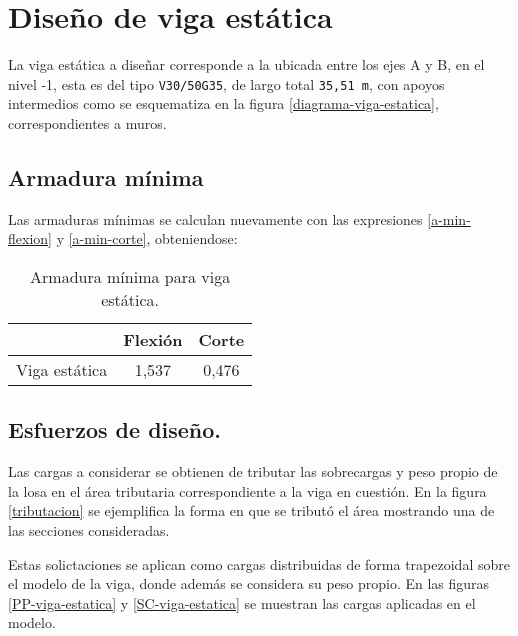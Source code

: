 \newpage
\section{Diseño de viga estática}

    La viga estática a diseñar corresponde a la ubicada entre los ejes A y B, en el nivel -1, esta es del tipo \texttt{V30/50G35}, de largo total \texttt{35,51 m}, con apoyos intermedios como se esquematiza en la figura \ref{diagrama-viga-estatica}, correspondientes a muros.
    
    
    \subsection{Armadura mínima}
        Las armaduras mínimas se calculan nuevamente con las expresiones \eqref{a-min-flexion} y \eqref{a-min-corte}, obteniendose:
        
        \begin{table}[H]
          \centering
          \caption{Armadura mínima para viga estática.}
            \begin{tabular}{ccc}
            \cline{2-3}          & Flexión & Corte \bigstrut\\
            \hline
            Viga estática & 1,537 & 0,476 \bigstrut\\
            \hline
            \end{tabular}%
          \label{area-minima-estatica}%
        \end{table}%
        
    \subsection{Esfuerzos de diseño.}
        
        Las cargas a considerar se obtienen de tributar las sobrecargas y peso propio de la losa en el área tributaria correspondiente a la viga en cuestión. En la figura \ref{tributacion} se ejemplifica la forma en que se tributó el área mostrando una de las secciones consideradas.
        
        
        Estas solictaciones se aplican como cargas distribuidas de forma trapezoidal sobre el modelo de la viga, donde además se considera su peso propio. En las figuras \ref{PP-viga-estatica} y \ref{SC-viga-estatica} se muestran las cargas aplicadas en el modelo.
        
